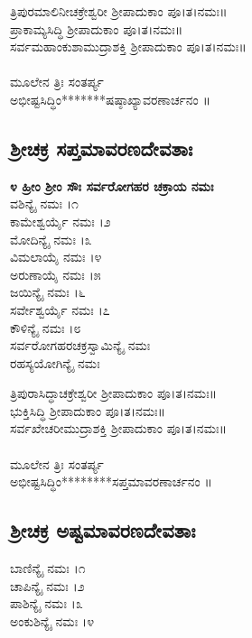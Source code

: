  ತ್ರಿಪುರಮಾಲಿನೀಚಕ್ರೇಶ್ವರೀ ಶ್ರೀಪಾದುಕಾಂ ಪೂ।ತ।ನಮಃ॥\\
 ಪ್ರಾಕಾಮ್ಯಸಿದ್ಧಿ ಶ್ರೀಪಾದುಕಾಂ ಪೂ।ತ।ನಮಃ॥\\
 ಸರ್ವಮಹಾಂಕುಶಾಮುದ್ರಾಶಕ್ತಿ ಶ್ರೀಪಾದುಕಾಂ ಪೂ।ತ।ನಮಃ॥\\
\\
ಮೂಲೇನ ತ್ರಿಃ ಸಂತರ್ಪ್ಯ\\
 ಅಭೀಷ್ಟಸಿದ್ಧಿಂ*******ಷಷ್ಠಾಖ್ಯಾವರಣಾರ್ಚನಂ ॥
\newpage
\subsection{ಶ್ರೀಚಕ್ರ ಸಪ್ತಮಾವರಣದೇವತಾಃ}
{\bfseries ೪ ಹ್ರೀಂ ಶ್ರೀಂ ಸೌಃ ಸರ್ವರೋಗಹರ ಚಕ್ರಾಯ ನಮಃ}\\
 ವಶಿನ್ಯೈ ನಮಃ ।೧\\
 ಕಾಮೇಶ್ವರ್ಯೈ ನಮಃ ।೨\\
 ಮೋದಿನ್ಯೈ ನಮಃ ।೩\\
 ವಿಮಲಾಯೈ ನಮಃ ।೪\\
 ಅರುಣಾಯೈ ನಮಃ ।೫\\
 ಜಯಿನ್ಯೈ ನಮಃ ।೬\\
 ಸರ್ವೇಶ್ವರ್ಯೈ ನಮಃ ।೭\\
 ಕೌಳಿನ್ಯೈ ನಮಃ ।೮\\
 ಸರ್ವರೋಗಹರಚಕ್ರಸ್ವಾಮಿನ್ಯೈ ನಮಃ\\
ರಹಸ್ಯಯೋಗಿನ್ಯೈ ನಮಃ

 ತ್ರಿಪುರಾಸಿದ್ಧಾಚಕ್ರೇಶ್ವರೀ ಶ್ರೀಪಾದುಕಾಂ ಪೂ।ತ।ನಮಃ॥\\
 ಭುಕ್ತಿಸಿದ್ಧಿ ಶ್ರೀಪಾದುಕಾಂ ಪೂ।ತ।ನಮಃ॥\\
 ಸರ್ವಖೇಚರೀಮುದ್ರಾಶಕ್ತಿ ಶ್ರೀಪಾದುಕಾಂ ಪೂ।ತ।ನಮಃ॥\\
\\
ಮೂಲೇನ ತ್ರಿಃ ಸಂತರ್ಪ್ಯ\\
 ಅಭೀಷ್ಟಸಿದ್ಧಿಂ********ಸಪ್ತಮಾವರಣಾರ್ಚನಂ ॥
\subsection{ಶ್ರೀಚಕ್ರ ಅಷ್ಟಮಾವರಣದೇವತಾಃ}
 ಬಾಣಿನ್ಯೈ ನಮಃ ।೧\\
 ಚಾಪಿನ್ಯೈ ನಮಃ ।೨\\
 ಪಾಶಿನ್ಯೈ ನಮಃ ।೩\\
 ಅಂಕುಶಿನ್ಯೈ ನಮಃ ।೪

